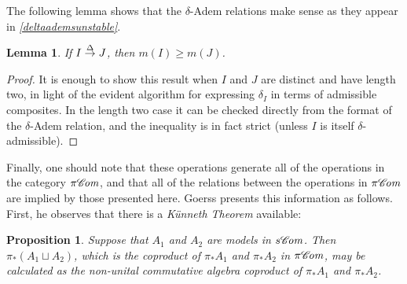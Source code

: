 \documentclass[11pt]{amsart} \renewcommand{\baselinestretch}{1.2}
\theoremstyle{plain}
\newtheorem{lem}[thm]{Lemma}
\newtheorem{prop}[thm]{Proposition}
\numberwithin{equation}{section} %
\theoremstyle{plain}
\newtheorem{lem}[thm]{Lemma}
\newtheorem{prop}[thm]{Proposition}
\numberwithin{equation}{chapter} %
\renewcommand{\to}{\longrightarrow}
\newcommand{\scrC}{\mathscr{C}}
\newcommand{\citeBOX}[2][]{\cite[\mbox{#1}]{#2}}
\newcommand{\deltaalg}{\Delta} %
\newcommand{\PA}[1]{\pi#1}
\newcommand{\minDimDelta}{m}
\newcommand{\produces}[3]{#3:#1\sim #2}
\renewcommand{\produces}[3]{#1\rightarrow_{#3} #2}%
\renewcommand{\produces}[3]{#1\overset{\smash{#3}}{\rightarrow} #2}%
\newcommand{\algs}{{\scrC\!\textit{\normalfont\textit{om}}}}
\begin{document}
\begin{Constructing homotopy operations}
The following lemma shows that the $\delta$-Adem relations make sense as they appear in \emph{\ref{deltaademsunstable}}.
\begin{lem}
\label{lemOnAdemChangeInMDeltaPlain}
If $\produces{I}{J}{\deltaalg}$, then $\minDimDelta(I)\geq\minDimDelta(J)$.
\end{lem}
\begin{proof}
It is enough to show this result when $I$ and $J$ are distinct and have length two, in light of the evident algorithm for expressing $\delta_I$ in terms of admissible composites. In the length two case it can be checked directly from the format of the $\delta$-Adem relation, and the inequality is in fact strict (unless $I$ is itself $\delta$-admissible).
\end{proof}
Finally, one should note that these operations generate all of the operations in the category $\PA{\algs}$, and that all of the relations between the operations in $\PA{\algs}$ are implied by those presented here. Goerss \citeBOX[\S2]{MR1089001} presents this information as follows. First, he observes that there is a \emph{K\"unneth Theorem} available:
\begin{prop}
\label{salgs homotopy kunneth}
Suppose that $A_1$ and $A_2$ are models in $s\algs$. Then $\pi_*(A_1\sqcup A_2)$, which is the coproduct of $\pi_*A_1$ and $\pi_*A_2$ in $\PA{\algs}$, may be calculated as the non-unital commutative algebra coproduct of $\pi_*A_1$ and $\pi_*A_2$.
\end{prop}

\end{Constructing homotopy operations}
\end{document}
